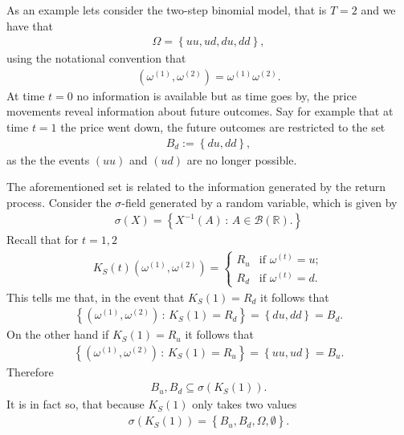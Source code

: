 \documentclass{article}
\theoremstyle{definition}
\numberwithin{equation}{section}
\begin{document}
As an example lets consider the two-step binomial model, that is $T = 2$ and we have that
\begin{align}
    \Omega = \left\{ uu, ud, du, dd \right\},
\end{align}
using the notational convention that
\begin{align}
    \left(
        \omega^{(1)}, \omega^{(2)}
    \right)
    =
    \omega^{(1)}\omega^{(2)}.
\end{align}
At time $t = 0$ no information is available but as time goes by, the price movements reveal information about future outcomes.
Say for example that at time $t = 1$ the price went down, the future outcomes are restricted to the set
\begin{align}
    B_d := \left\{ du, dd \right\},
\end{align}
as the the events $(uu)$ and $(ud)$ are no longer possible.

The aforementioned set is related to the information generated by the return process.
Consider the $\sigma$-field generated by a random variable, which is given by
\begin{align}
    \sigma(X) = \left\{
        X^{-1}(A) \, : \, A \in \mathscr{B}(\mathbb{R}).
    \right\}
\end{align}
Recall that for $t = 1,2$
\begin{align}
    K_S(t)\left(
        \omega^{(1)}, \omega^{(2)}
    \right) = 
    \begin{cases}
        R_u &\text{if } \omega^{(t)} = u; \\
        R_d &\text{if } \omega^{(t)} = d.
    \end{cases}
\end{align}
This tells me that, in the event that $K_S(1) = R_d$ it follows that
\begin{align}
    \left\{
        \left(
            \omega^{(1)}, \omega^{(2)}
        \right)
        \, : \,
        K_S(1) = R_d
    \right\} =
    \left\{
        du, dd 
    \right\} = B_d.
\end{align}
On the other hand if $K_S(1) = R_u$ it follows that
\begin{align}
    \left\{
        \left(
            \omega^{(1)}, \omega^{(2)}
        \right)
        \, : \,
        K_S(1) = R_u
    \right\} =
    \left\{
        uu, ud 
    \right\} = B_u.
\end{align}
Therefore
\begin{align}
    B_u, B_d \subseteq \sigma\left(K_S(1)\right).
\end{align}
It is in fact so, that because $K_S(1)$ only takes two values
\begin{align}
    \sigma(K_S(1)) = \left\{B_u, B_d, \Omega, \emptyset\right\}.
\end{align}
\end{document}
